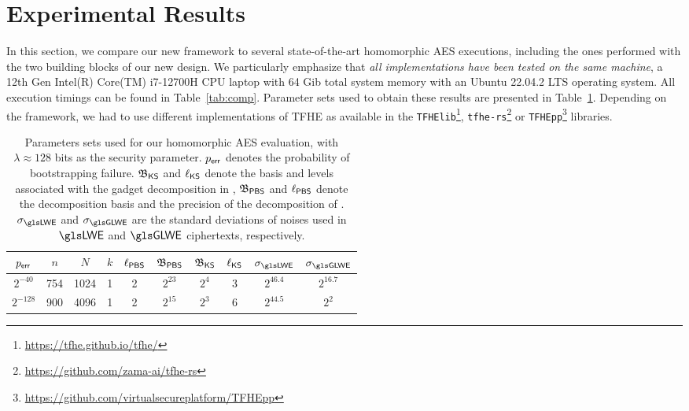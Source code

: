\section{Experimental Results}
\label{sec:comparison}

In this section, we compare our new framework to several state-of-the-art homomorphic \gls{AES} executions, including the ones performed with the two building blocks of our new design.
We particularly emphasize that \textit{all implementations have been tested on the same machine}, a 12th Gen Intel(R) Core(TM) i7-12700H CPU laptop with 64 Gib total system memory with an Ubuntu 22.04.2 LTS operating system. All execution timings can be found in Table~\ref{tab:comp}.
Parameter sets used to obtain these results are presented in Table~\ref{tab:params}.
Depending on the framework, we had to use different implementations of \gls{TFHE} as available in the \texttt{TFHElib}\footnote{\url{https://tfhe.github.io/tfhe/}}, \texttt{tfhe-rs}\footnote{\url{https://github.com/zama-ai/tfhe-rs}} or \texttt{TFHEpp}\footnote{\url{https://github.com/virtualsecureplatform/TFHEpp}} libraries.


\begin{table}[htbp]
\caption{Parameters sets used for our homomorphic \gls{AES} evaluation, with $\lambda\approx128$ bits as the security parameter. $p_{\textsf{err}}$ denotes the probability of bootstrapping failure. $\mathfrak{B}_{\textsf{KS}}$ and $\ell_{\textsf{KS}}$ denote the basis and levels associated with the gadget decomposition in \KeySwitch, $\mathfrak{B}_{\textsf{PBS}}$ and $\ell_{\textsf{PBS}}$ denote the decomposition basis and the precision of the decomposition of \BlindRotate. $\lweSigma$ and $\glweSigma$ are the standard deviations of noises used in $\LWE$ and $\GLWE$ ciphertexts, respectively.}
\label{tab:params}
\begin{adjustbox}{center}
\begin{tabular}{|c||c|c|c|c|c|c|c|c|c|}
\hline
 $p_{\textsf{err}}$ &  $n$   & $N$ & $k$   & $\ell_{\textsf{PBS}}$ & $\mathfrak{B}_{\textsf{PBS}}$ & $\mathfrak{B}_{\textsf{KS}}$ & $\ell_{\textsf{KS}}$ & $\lweSigma$ & $\glweSigma$ \\ \hline
  $2^{-40}$ & 754     &    1024  & 1  &  2   &    $2^{23}$   &   $2^4$     &   3  &  $2^{46.4}$       &    $2^{16.7}$       \\ \hline  
    $2^{-128}$ &   900    &   4096   & 1  &   2  &   $2^{15}$   &    $2^3$    &  6 &    $2^{44.5}$      &    $2^2$      \\ \hline  
\end{tabular}
\end{adjustbox}
\end{table}

